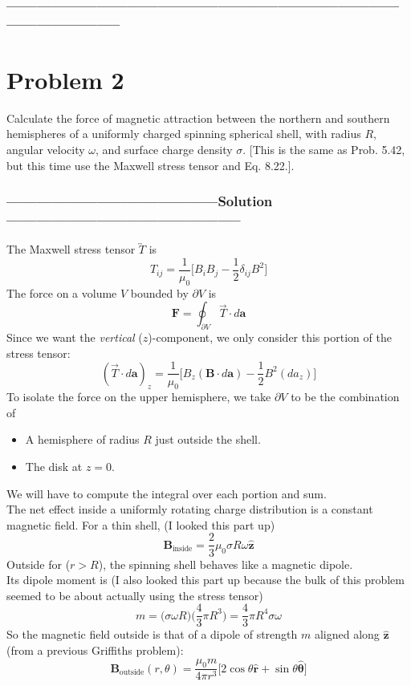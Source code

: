 \documentclass[a4paper,12pt]{article} %
\begin{document}
\subsubsection*{-----------------------------------------------------------------------------------------------------}

\section*{Problem 2}
Calculate the force of magnetic attraction between the northern and southern hemispheres of a uniformly charged spinning spherical shell, with radius $R$, angular velocity $\omega$, and surface charge density $\sigma$. [This is the same as Prob. 5.42, but this time use the Maxwell stress tensor and Eq. 8.22.].
\subsubsection*{------------------------------------------Solution-----------------------------------------------}
The Maxwell stress tensor $\overleftrightarrow{T}$ is
$$
T_{ij} = \frac{1}{\mu_0}\Big[B_i B_j - \frac{1}{2}\delta_{ij}B^2\Big]
$$
The force on a volume $V$ bounded by $\partial V$ is
$$
\mathbf{F}=\oint_{\partial V} \overrightarrow{T} \cdot d\mathbf{a}
$$
Since we want the \emph{vertical} ($z$)-component, we only consider this portion of the stress tensor:
$$
(\overrightarrow{T}\cdot d\mathbf{a})_z =\frac{1}{\mu_0} \Big[B_z (\mathbf{B}\cdot d\mathbf{a})-\frac{1}{2}B^2(d a_z)\Big]
$$
  To isolate the force on the upper hemisphere, we take \(\partial V\) to be the combination of
\begin{itemize}
\item A hemisphere of radius $R$ just outside the shell.
\item The disk at $z=0$.
\end{itemize}
We will have to compute the integral over each portion and sum.\\

The net effect inside a uniformly rotating charge distribution is a constant magnetic field. For a thin shell, (I looked this part up)
$$
\mathbf{B}_{\text{inside}}=\frac{2}{3}\mu_0\sigma R\omega\hat{\mathbf{z}}
$$
Outside for ($r > R$), the spinning shell behaves like a magnetic dipole. \\

Its dipole moment is (I also looked this part up because the bulk of this problem seemed to be about actually using the stress tensor)
$$m = \Big(\sigma\omega R\Big) \Big(\frac{4}{3}\pi R^3\Big)=\frac{4}{3}\pi R^4\sigma\omega
$$
So the magnetic field outside is that of a dipole of strength $m$ aligned along $\hat{\mathbf{z}}$ (from a previous Griffiths problem):
$$
\mathbf{B}_{\text{outside}}(r,\theta)=\frac{\mu_0m}{4\pi r^3}\Big[2\cos\theta\hat{\mathbf{r}}+\sin\theta\hat{\boldsymbol{\theta}}
\Big]
$$
\end{document}
